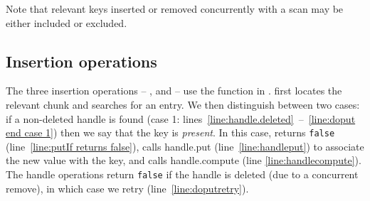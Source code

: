 Note that relevant keys inserted or removed concurrently with a scan may be either included or excluded.

\subsection{Insertion operations} 
\label{ssec:doput}

The three insertion operations --  , and   -- use  the  function in .
 first locates the relevant chunk and searches for an entry. We then distinguish between two cases: if a non-deleted handle is found (case 1: lines~\ref{line:handle.deleted}~--~\ref{line:doput end case 1}) then we say that the key is \emph{present}.
In this case,  returns \texttt{false} (line~\ref{line:putIf returns false}),  calls handle.put (line~\ref{line:handleput}) to associate the new value with the key, and   calls handle.compute (line \ref{line:handlecompute}). 
The  handle operations return \texttt{false} if the handle is deleted (due to a concurrent remove), in which case we retry (line~\ref{line:doputretry}).






